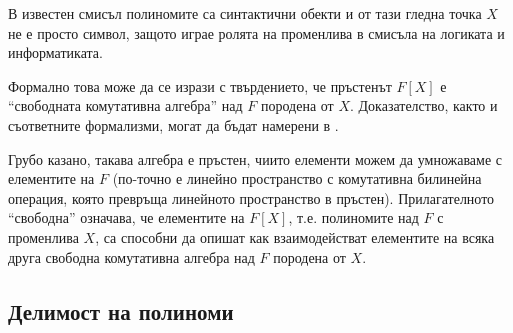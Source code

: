 \documentclass{../../common/topic}
\begin{document}
\begin{remark}\label{rem:polynomials_as_syntax}
  В известен смисъл полиномите са синтактични обекти и от тази гледна точка \( X \) не е просто символ, защото играе ролята на променлива в смисъла на логиката и информатиката.

  Формално това може да се изрази с твърдението, че пръстенът \( F[X] \) е \enquote{свободната комутативна алгебра} над \( F \) породена от \( X \). Доказателство, както и съответните формализми, могат да бъдат намерени в \cite[пример 1-3.24]{Rotman2015AlgebraVol1}.

  Грубо казано, такава алгебра е пръстен, чиито елементи можем да умножаваме с елементите на \( F \) (по-точно е линейно пространство с комутативна билинейна операция, която превръща линейното пространство в пръстен). Прилагателното \enquote{свободна} означава, че елементите на \( F[X] \), т.е. полиномите над \( F \) с променлива \( X \), са способни да опишат как взаимодействат елементите на всяка друга свободна комутативна алгебра над \( F \) породена от \( X \).
\end{remark}

\subsection{Делимост на полиноми}
\end{document}
